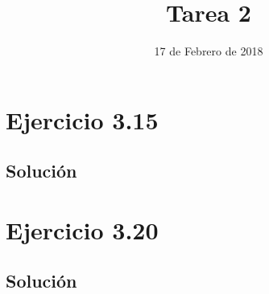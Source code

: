 \documentclass[11pt, a4paper, titlepage]{article}
\begin{document}
\title{Tarea 2}
\date{17 de Febrero de 2018}
\maketitle
\newpage



\section*{Ejercicio 3.15}
\subsection*{Solución}

\section*{Ejercicio 3.20}
\subsection*{Solución}
\end{document}
